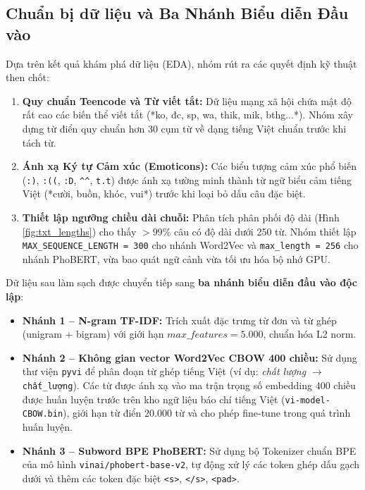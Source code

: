 \documentclass[a4paper,11pt]{article}
\begin{document}
\subsection{Chuẩn bị dữ liệu và Ba Nhánh Biểu diễn Đầu vào}
Dựa trên kết quả khám phá dữ liệu (EDA), nhóm rút ra các quyết định kỹ thuật then chốt:
\begin{enumerate}
    \item \textbf{Quy chuẩn Teencode và Từ viết tắt:} Dữ liệu mạng xã hội chứa mật độ rất cao các biến thể viết tắt (*ko, đc, sp, wa, thik, mik, bthg...*). Nhóm xây dựng từ điển quy chuẩn hơn 30 cụm từ về dạng tiếng Việt chuẩn trước khi tách từ.
    \item \textbf{Ánh xạ Ký tự Cảm xúc (Emoticons):} Các biểu tượng cảm xúc phổ biến (\texttt{:)}, \texttt{:((}, \texttt{:D}, \texttt{\textasciicircum\textasciicircum}, \texttt{t.t}) được ánh xạ tường minh thành từ ngữ biểu cảm tiếng Việt (*cười, buồn, khóc, vui*) trước khi loại bỏ dấu câu đặc biệt.
    \item \textbf{Thiết lập ngưỡng chiều dài chuỗi:} Phân tích phân phối độ dài (Hình \ref{fig:txt_lengths}) cho thấy $>99\%$ câu có độ dài dưới 250 từ. Nhóm thiết lập \texttt{MAX\_SEQUENCE\_LENGTH = 300} cho nhánh Word2Vec và \texttt{max\_length = 256} cho nhánh PhoBERT, vừa bao quát ngữ cảnh vừa tối ưu hóa bộ nhớ GPU.
\end{enumerate}

Dữ liệu sau làm sạch được chuyển tiếp sang \textbf{ba nhánh biểu diễn đầu vào độc lập}:
\begin{itemize}
    \item \textbf{Nhánh 1 -- N-gram TF-IDF:} Trích xuất đặc trưng từ đơn và từ ghép (unigram + bigram) với giới hạn $max\_features = 5.000$, chuẩn hóa L2 norm.
    \item \textbf{Nhánh 2 -- Không gian vector Word2Vec CBOW 400 chiều:} Sử dụng thư viện \texttt{pyvi} để phân đoạn từ ghép tiếng Việt (ví dụ: \textit{chất lượng} $\to$ \texttt{chất\_lượng}). Các từ được ánh xạ vào ma trận trọng số embedding 400 chiều được huấn luyện trước trên kho ngữ liệu báo chí tiếng Việt (\texttt{vi-model-CBOW.bin}), giới hạn từ điển $20.000$ từ và cho phép fine-tune trong quá trình huấn luyện.
    \item \textbf{Nhánh 3 -- Subword BPE PhoBERT:} Sử dụng bộ Tokenizer chuẩn BPE của mô hình \texttt{vinai/phobert-base-v2}, tự động xử lý các token ghép dấu gạch dưới và thêm các token đặc biệt \texttt{<s>}, \texttt{</s>}, \texttt{<pad>}.
\end{itemize}
\end{document}
